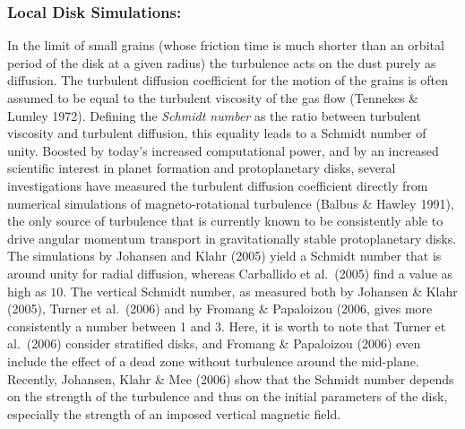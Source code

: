 \subsubsection{Local Disk Simulations:}
%
In the limit of small grains (whose friction time is much shorter than an
orbital period of the disk at a given radius) the turbulence acts on the
dust purely as diffusion. The turbulent diffusion coefficient for the motion
of the grains is often assumed to be equal to the turbulent viscosity of the
gas flow (Tennekes \& Lumley 1972). Defining the {\it Schmidt number} as
the ratio between turbulent viscosity and turbulent diffusion, this
equality leads to a Schmidt number of unity.  Boosted by today's increased
computational power, and by an increased scientific interest in planet
formation and protoplanetary disks, several investigations have measured the
turbulent diffusion coefficient directly from numerical simulations of
magneto-rotational turbulence (Balbus \& Hawley 1991), the only source of
turbulence that is currently known to be consistently able to drive angular
momentum transport in gravitationally stable protoplanetary disks. The
simulations by Johansen and Klahr (2005) yield a Schmidt number that is
around unity for radial diffusion, whereas Carballido et al.\ (2005) find a
value as high as $10$.  The vertical Schmidt number, as measured both by
Johansen \& Klahr (2005), Turner et al.\ (2006) and by Fromang \&
Papaloizou (2006, gives more consistently a number between 1 and 3. Here, it
is worth to note that Turner et al.\ (2006) consider stratified disks, and
Fromang \& Papaloizou (2006) even include the effect of a dead zone without
turbulence around the mid-plane.  Recently, Johansen, Klahr \& Mee (2006)
show that the Schmidt number depends on the strength of the turbulence and
thus on the initial parameters of the disk, especially the strength of an
imposed vertical magnetic field.
%

